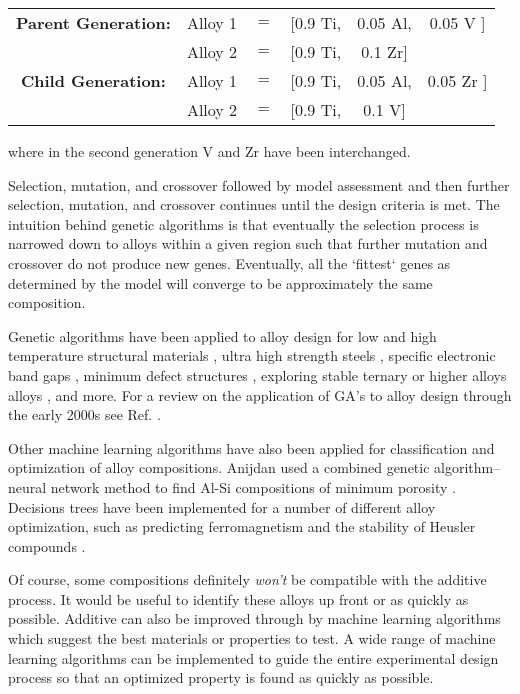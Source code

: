 \begin{table}[h!]
\begin{center}
\begin{tabular}{c|ccccc}
	\textbf{Parent Generation:} & Alloy 1 & $=$ & [0.9 Ti, & 0.05 Al, & 0.05 {\color{red} V} ]  \\
						 & Alloy 2 & $=$ & [0.9 Ti, & 0.1 {\color{green} Zr}] &              \\ \hline
 

	 \textbf{Child Generation:} & Alloy 1 & $=$ & [0.9 Ti, & 0.05 Al, & 0.05 {\color{green} Zr} ]  \\
						& Alloy 2 & $=$ & [0.9 Ti, & 0.1 {\color{red} V}] &              \\ 
\end{tabular}
\end{center}
\end{table}
where in the second generation V and Zr have been interchanged. 

Selection, mutation, and crossover followed by model assessment and then further selection, mutation, and crossover continues until the design criteria is met. The intuition behind genetic algorithms is that eventually the selection process is narrowed down to alloys within a given region such that further mutation and crossover do not produce new genes. Eventually, all the `fittest` genes as determined by the model will converge to be approximately the same composition. 

Genetic algorithms have been applied to alloy design for low and high temperature structural materials \cite{Ikeda1997, Kulkarni2004}, ultra high strength steels \cite{Xu2008}, specific electronic band gaps \cite{Dudiy2006}, minimum defect structures \cite{Anijdan2006}, exploring stable ternary or higher alloys alloys \cite{Hautier2010, Johannesson2002}, and more. For a review on the application of GA's to alloy design through the early 2000s see Ref. \cite{Chakraborti2004}.

Other machine learning algorithms have also been applied for classification and optimization of alloy compositions. Anijdan used a combined genetic algorithm--neural network method to find Al-Si compositions of minimum porosity \cite{Anijdan2006}. Decisions trees have been implemented for a number of different alloy optimization, such as predicting ferromagnetism \cite{Landrum2003} and the stability of Heusler compounds \cite{Oliynyk2016}. 
 
Of course, some compositions definitely \textit{won't} be compatible with the additive process. It would be useful to identify these alloys up front or as quickly as possible. Additive can also be improved through by machine learning algorithms which suggest the best materials or properties to test. A wide range of machine learning algorithms can be implemented to guide the entire experimental design process so that an optimized property is found as quickly as possible. 